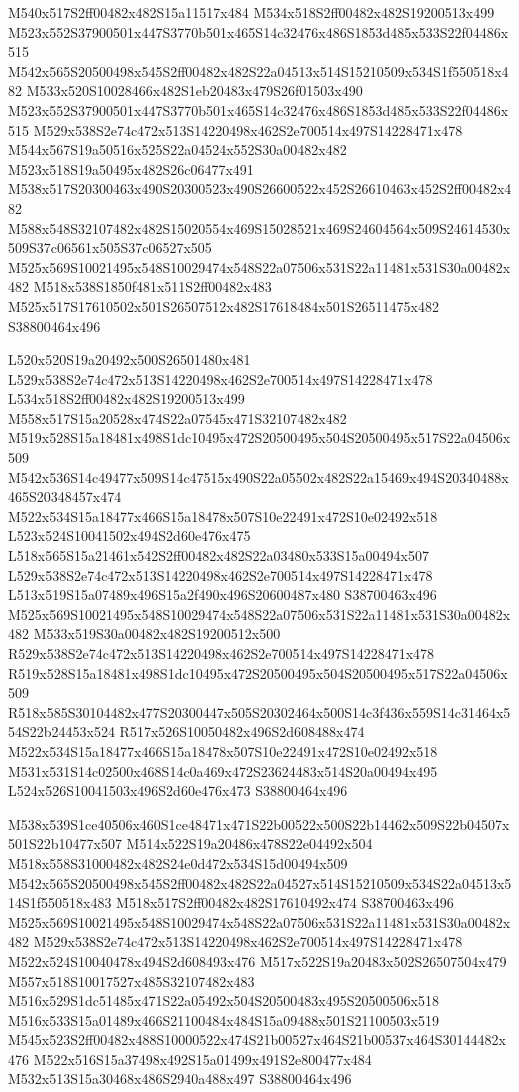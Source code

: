 \documentclass{article}
\begin{document}
\begin{multicols}{2}
M540x517S2ff00482x482S15a11517x484 M534x518S2ff00482x482S19200513x499 M523x552S37900501x447S3770b501x465S14c32476x486S1853d485x533S22f04486x515 M542x565S20500498x545S2ff00482x482S22a04513x514S15210509x534S1f550518x482 M533x520S10028466x482S1eb20483x479S26f01503x490 M523x552S37900501x447S3770b501x465S14c32476x486S1853d485x533S22f04486x515 M529x538S2e74c472x513S14220498x462S2e700514x497S14228471x478 M544x567S19a50516x525S22a04524x552S30a00482x482 M523x518S19a50495x482S26c06477x491 M538x517S20300463x490S20300523x490S26600522x452S26610463x452S2ff00482x482 M588x548S32107482x482S15020554x469S15028521x469S24604564x509S24614530x509S37c06561x505S37c06527x505 M525x569S10021495x548S10029474x548S22a07506x531S22a11481x531S30a00482x482 M518x538S1850f481x511S2ff00482x483 M525x517S17610502x501S26507512x482S17618484x501S26511475x482 S38800464x496

L520x520S19a20492x500S26501480x481 L529x538S2e74c472x513S14220498x462S2e700514x497S14228471x478 L534x518S2ff00482x482S19200513x499 M558x517S15a20528x474S22a07545x471S32107482x482 M519x528S15a18481x498S1dc10495x472S20500495x504S20500495x517S22a04506x509 M542x536S14c49477x509S14c47515x490S22a05502x482S22a15469x494S20340488x465S20348457x474 M522x534S15a18477x466S15a18478x507S10e22491x472S10e02492x518 L523x524S10041502x494S2d60e476x475 L518x565S15a21461x542S2ff00482x482S22a03480x533S15a00494x507 L529x538S2e74c472x513S14220498x462S2e700514x497S14228471x478 L513x519S15a07489x496S15a2f490x496S20600487x480 S38700463x496 M525x569S10021495x548S10029474x548S22a07506x531S22a11481x531S30a00482x482 M533x519S30a00482x482S19200512x500 R529x538S2e74c472x513S14220498x462S2e700514x497S14228471x478 R519x528S15a18481x498S1dc10495x472S20500495x504S20500495x517S22a04506x509 R518x585S30104482x477S20300447x505S20302464x500S14c3f436x559S14c31464x554S22b24453x524 R517x526S10050482x496S2d608488x474 M522x534S15a18477x466S15a18478x507S10e22491x472S10e02492x518 M531x531S14c02500x468S14c0a469x472S23624483x514S20a00494x495 L524x526S10041503x496S2d60e476x473 S38800464x496

M538x539S1ce40506x460S1ce48471x471S22b00522x500S22b14462x509S22b04507x501S22b10477x507 M514x522S19a20486x478S22e04492x504 M518x558S31000482x482S24e0d472x534S15d00494x509 M542x565S20500498x545S2ff00482x482S22a04527x514S15210509x534S22a04513x514S1f550518x483 M518x517S2ff00482x482S17610492x474 S38700463x496 M525x569S10021495x548S10029474x548S22a07506x531S22a11481x531S30a00482x482 M529x538S2e74c472x513S14220498x462S2e700514x497S14228471x478 M522x524S10040478x494S2d608493x476 M517x522S19a20483x502S26507504x479 M557x518S10017527x485S32107482x483 M516x529S1dc51485x471S22a05492x504S20500483x495S20500506x518 M516x533S15a01489x466S21100484x484S15a09488x501S21100503x519 M545x523S2ff00482x488S10000522x474S21b00527x464S21b00537x464S30144482x476 M522x516S15a37498x492S15a01499x491S2e800477x484 M532x513S15a30468x486S2940a488x497 S38800464x496


\end{multicols}
\end{document}
